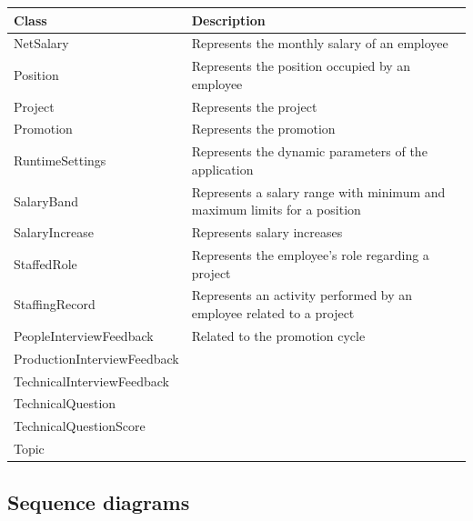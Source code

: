 \documentclass[12pt,a4paper,table,english]{article}
\begin{document}
	\begin{center}
		\renewcommand{\arraystretch}{1.5} %
		\begin{tabularx}{\textwidth}{| l | X |}
			\hline
			\textbf{Class} & \textbf{Description} \\\hline
			
			NetSalary & Represents the monthly salary of an employee \\\hline
						
			Position & Represents the position occupied by an employee \\\hline
			
			Project & Represents the project \\\hline
			
			Promotion & Represents the promotion \\\hline
			
			RuntimeSettings & Represents the dynamic parameters of the application\\\hline
			
			SalaryBand & Represents a salary range with minimum and maximum limits for a position \\\hline
			
			SalaryIncrease & Represents salary increases \\\hline
			
			StaffedRole & Represents the employee's role regarding a project \\\hline
			
			StaffingRecord & Represents an activity performed by an employee related to a project \\\hline\hline
			
			PeopleInterviewFeedback & Related to the promotion cycle\\
			ProductionInterviewFeedback & \\
			TechnicalInterviewFeedback & \\
			TechnicalQuestion & \\
			TechnicalQuestionScore & \\
			Topic & \\\hline
			 
		
		\end{tabularx}
	\end{center}

	\newpage	
	
	\subsection{Sequence diagrams}
	
\end{document}
